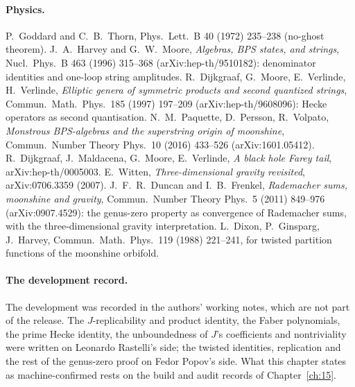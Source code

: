 \paragraph{Physics.}  P.~Goddard and C.~B.~Thorn, Phys.\ Lett.\ B 40 (1972) 235--238 (no-ghost theorem).  J.~A.~Harvey and G.~W.~Moore,
\emph{Algebras, BPS states, and strings}, Nucl.\ Phys.\ B 463 (1996) 315--368 (arXiv:hep-th/9510182): denominator identities and one-loop string
amplitudes.  R.~Dijkgraaf, G.~Moore, E.~Verlinde, H.~Verlinde, \emph{Elliptic genera of symmetric products and second quantized strings},
Commun.\ Math.\ Phys.\ 185 (1997) 197--209 (arXiv:hep-th/9608096): Hecke operators as second quantisation.  N.~M.~Paquette, D.~Persson,
R.~Volpato, \emph{Monstrous BPS-algebras and the superstring origin of moonshine}, Commun.\ Number Theory Phys.\ 10 (2016) 433--526
(arXiv:1601.05412).  R.~Dijkgraaf, J.~Maldacena, G.~Moore, E.~Verlinde, \emph{A black hole Farey tail}, arXiv:hep-th/0005003.  E.~Witten,
\emph{Three-dimensional gravity revisited}, arXiv:0706.3359 (2007).  J.~F.~R.~Duncan and I.~B.~Frenkel, \emph{Rademacher sums, moonshine and
gravity}, Commun.\ Number Theory Phys.\ 5 (2011) 849--976 (arXiv:0907.4529): the genus-zero property as convergence of Rademacher sums, with
the three-dimensional gravity interpretation.  L.~Dixon, P.~Ginsparg, J.~Harvey, Commun.\ Math.\ Phys.\ 119 (1988) 221--241, for twisted
partition functions of the moonshine orbifold.

\paragraph{The development record.}  The development was recorded in the authors' working notes, which are not part of the release.
The $J$-replicability and product identity, the Faber polynomials, the prime Hecke identity, the unboundedness of $J$'s coefficients and
nontriviality were written on Leonardo Rastelli's side; the twisted identities, replication and the rest of the genus-zero proof on Fedor
Popov's side.  What this chapter states as machine-confirmed rests on the build and audit records of Chapter~\ref{ch:15}.

\endgroup
